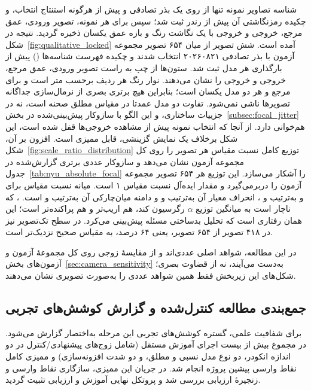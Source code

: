 شناسه تصاویر نمونه تنها از روی یک بذر تصادفی و پیش از هرگونه استنتاج انتخاب، و چکیده رمزنگاشتی آن پیش از رندر ثبت شد؛ سپس برای هر نمونه، تصویر ورودی، عمق مرجع، خروجی \controlmodel{} و خروجی \proposedmodel{} با یک نگاشت رنگ و بازه عمق یکسان ذخیره گردید. نتیجه در شکل~\ref{fig:qualitative_locked} آمده است. شش تصویر از میان ۶۵۴ تصویر مجموعه آزمون با بذر تصادفی ۲۰۲۶۰۸۲۱ انتخاب شدند و چکیده  فهرست شناسه‌ها () پیش از بارگذاری هر مدل ثبت شد. ستون‌ها از چپ به راست تصویر ورودی، عمق مرجع، خروجی \controlmodel{} و خروجی \proposedmodel{} را نشان می‌دهند. نوار رنگ هر ردیف برحسب متر است و برای مرجع و هر دو مدل یکسان است؛ بنابراین هیچ برتری بصری از نرمال‌سازی جداگانه تصویرها ناشی نمی‌شود. تفاوت دو مدل عمدتا در مقیاس مطلق صحنه است، نه در جزییات ساختاری، و این الگو با سازوکار پیش‌بینی‌شده در بخش~\ref{subsec:focal_jitter} هم‌خوانی دارد. از آنجا که انتخاب نمونه پیش از مشاهده خروجی‌ها قفل شده است، این شکل برخلاف یک نمایش گزینشی، قابل ممیزی است. افزون بر آن، شکل~\ref{fig:scale_ratio_distribution} توزیع کامل نسبت مقیاس هر تصویر را روی کل مجموعه آزمون نشان می‌دهد و سازوکار عددی برتری گزارش‌شده در جدول~\ref{tab:nyu_absolute_focal} را آشکار می‌سازد. این توزیع هر ۶۵۴ تصویر مجموعه آزمون را دربرمی‌گیرد و مقدار ایده‌آل نسبت مقیاس ۱ است. میانه نسبت مقیاس برای \proposedmodel{} و \controlmodel{} به‌ترتیب  و ، انحراف معیار آن به‌ترتیب  و  و دامنه میان‌چارکی آن به‌ترتیب  و  است. \controlmodel{}، که ناچار است به میانگین توزیع $\alpha$ رگرسیون کند، هم اریب‌تر و هم پراکنده‌تر است؛ این همان رفتاری است که تحلیل بدساختی مسئله پیش‌بینی می‌کرد. در سطح تک‌تصویر نیز \proposedmodel{} در ۴۱۸ تصویر از ۶۵۴ تصویر، یعنی ۶۴ درصد، به مقیاس صحیح نزدیک‌تر است.

در این مطالعه، شواهد اصلی عددی‌اند و از مقایسهٔ زوجی روی کل مجموعهٔ آزمون و آزمون‌های بخش~\ref{sec:camera_sensitivity} به‌دست می‌آیند، نه از قضاوت بصری؛ شکل‌های این زیربخش فقط همین شواهد عددی را به‌صورت تصویری نشان می‌دهند.



\subsection{جمع‌بندی مطالعه کنترل‌شده و گزارش کوشش‌های تجربی}
\label{subsec:controlled_study_summary}

برای شفافیت علمی، گستره کوشش‌های تجربی این مرحله به‌اختصار گزارش می‌شود. در مجموع بیش از بیست اجرای آموزش مستقل (شامل زوج‌های پیشنهادی/کنترل در دو اندازه انکودر، دو نوع مدل نسبی و مطلق، و دو شدت افزونه‌سازی) و ممیزی کامل نقاط وارسی پیشین پروژه انجام شد. در جریان این ممیزی، سازگاری نقاط وارسی و زنجیرهٔ ارزیابی بررسی شد و پروتکل نهایی آموزش و ارزیابی تثبیت گردید.

